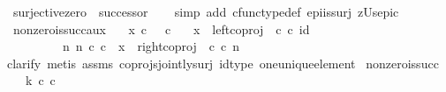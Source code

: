 \begin{isabellebody}
\ {\isachardoublequoteopen}surjective{\isacharparenleft}{\kern0pt}zero\ {\isasymamalg}\ successor{\isacharparenright}{\kern0pt}{\isachardoublequoteclose}\isanewline
%
\isadelimproof
\ \ %
\endisadelimproof
%
\isatagproof
{}\isamarkupfalse%
\ {\isacharparenleft}{\kern0pt}simp\ add{\isacharcolon}{\kern0pt}\ cfunc{\isacharunderscore}{\kern0pt}type{\isacharunderscore}{\kern0pt}def\ epi{\isacharunderscore}{\kern0pt}is{\isacharunderscore}{\kern0pt}surj\ zUs{\isacharunderscore}{\kern0pt}epic{\isacharparenright}{\kern0pt}%
\endisatagproof
{\isafoldproof}%
%
\isadelimproof
\isanewline
%
\endisadelimproof
\isanewline
{}\isamarkupfalse%
\ nonzero{\isacharunderscore}{\kern0pt}is{\isacharunderscore}{\kern0pt}succ{\isacharunderscore}{\kern0pt}aux{\isacharcolon}{\kern0pt}\isanewline
\ \ \ {\isachardoublequoteopen}x\ {\isasymin}\isactrlsub c\ {\isacharparenleft}{\kern0pt}{\isasymone}\ {\isasymCoprod}\ {\isasymnat}\isactrlsub c{\isacharparenright}{\kern0pt}{\isachardoublequoteclose}\isanewline
\ \ \ {\isachardoublequoteopen}{\isacharparenleft}{\kern0pt}x\ {\isacharequal}{\kern0pt}\ {\isacharparenleft}{\kern0pt}left{\isacharunderscore}{\kern0pt}coproj\ {\isasymone}\ {\isasymnat}\isactrlsub c{\isacharparenright}{\kern0pt}\ {\isasymcirc}\isactrlsub c\ id\ {\isasymone}{\isacharparenright}{\kern0pt}\ {\isasymor}\isanewline
\ \ \ \ \ \ \ \ \ {\isacharparenleft}{\kern0pt}{\isasymexists}n{\isachardot}{\kern0pt}\ {\isacharparenleft}{\kern0pt}n\ {\isasymin}\isactrlsub c\ {\isasymnat}\isactrlsub c{\isacharparenright}{\kern0pt}\ {\isasymand}\ {\isacharparenleft}{\kern0pt}x\ {\isacharequal}{\kern0pt}\ {\isacharparenleft}{\kern0pt}right{\isacharunderscore}{\kern0pt}coproj\ {\isasymone}\ {\isasymnat}\isactrlsub c{\isacharparenright}{\kern0pt}\ {\isasymcirc}\isactrlsub c\ n{\isacharparenright}{\kern0pt}{\isacharparenright}{\kern0pt}{\isachardoublequoteclose}\isanewline
%
\isadelimproof
\ \ %
\endisadelimproof
%
\isatagproof
{}\isamarkupfalse%
{\isacharparenleft}{\kern0pt}clarify{\isacharcomma}{\kern0pt}\ metis\ assms\ coprojs{\isacharunderscore}{\kern0pt}jointly{\isacharunderscore}{\kern0pt}surj\ id{\isacharunderscore}{\kern0pt}type\ one{\isacharunderscore}{\kern0pt}unique{\isacharunderscore}{\kern0pt}element{\isacharparenright}{\kern0pt}%
\endisatagproof
{\isafoldproof}%
%
\isadelimproof
\isanewline
%
\endisadelimproof
\isanewline
{}\isamarkupfalse%
\ nonzero{\isacharunderscore}{\kern0pt}is{\isacharunderscore}{\kern0pt}succ{\isacharcolon}{\kern0pt}\isanewline
\ \ \ {\isachardoublequoteopen}k\ {\isasymin}\isactrlsub c\ {\isasymnat}\isactrlsub c{\isachardoublequoteclose}\isanewline

\end{isabellebody}
